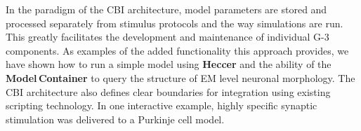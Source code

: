 \documentclass[10pt]{article}
\begin{document}
%

In the paradigm of the CBI architecture, model
parameters are stored and processed separately from stimulus protocols and the way
simulations are run.  This greatly facilitates the development and
maintenance of individual G-3
components.  As examples of the added functionality this approach 
provides, we have shown how to run a simple model using {\bf Heccer} and the ability of the
{\bf Model\,Container} to query the structure of EM level neuronal morphology. 
The CBI architecture also defines clear
boundaries for integration using existing scripting technology.
In one interactive example, highly specific synaptic stimulation was delivered to a Purkinje cell model.
\end{document}
